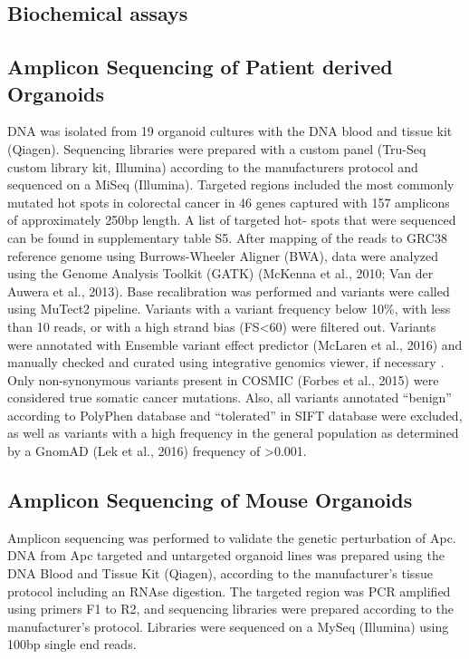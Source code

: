 \begin{flushleft}
\section{Biochemical assays}


\subsection{Amplicon Sequencing of Patient derived Organoids}
DNA was isolated from 19 organoid cultures with the DNA blood and tissue kit (Qiagen). Sequencing libraries were prepared with a custom panel (Tru-Seq custom library kit, Illumina) according to the manufacturers protocol and sequenced on a MiSeq (Illumina). Targeted regions included the most commonly mutated hot spots in colorectal cancer in 46 genes captured with 157 amplicons of approximately 250bp length. A list of targeted hot- spots that were sequenced can be found in supplementary table S5. After mapping of the reads to GRC38 reference genome using Burrows-Wheeler Aligner (BWA), data were analyzed using the Genome Analysis Toolkit (GATK) (McKenna et al., 2010; Van der Auwera et al., 2013). Base recalibration was performed and variants were called using MuTect2 pipeline. Variants with a variant frequency below 10\%, with less than 10 reads, or with a high strand bias (FS<60) were filtered out. Variants were annotated with Ensemble variant effect predictor (McLaren et al., 2016) and manually checked and curated using integrative genomics viewer, if necessary \cite{Thorvaldsdottir}. Only non-synonymous variants present in COSMIC (Forbes et al., 2015) were considered true somatic cancer mutations.
Also, all variants annotated “benign” according to PolyPhen database and “tolerated” in SIFT database were excluded, as well as variants with a high frequency in the general population as determined by a GnomAD (Lek et al., 2016) frequency of >0.001.

\subsection{Amplicon Sequencing of Mouse Organoids}
Amplicon sequencing was performed to validate the genetic perturbation of Apc. DNA from Apc targeted and untargeted organoid lines was prepared using the DNA Blood and Tissue Kit (Qiagen), according to the manufacturer’s tissue protocol including an RNAse digestion. The targeted region was PCR amplified using primers F1 to R2, and sequencing libraries were prepared according to the manufacturer’s protocol. Libraries were sequenced on a MySeq (Illumina) using 100bp single end reads. 


\end{flushleft}
